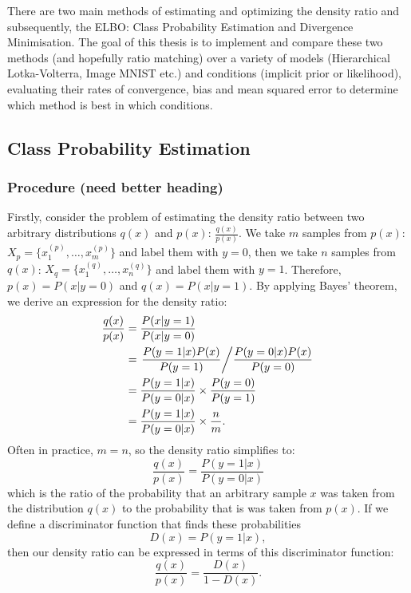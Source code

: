 \documentclass[a4paper,12pt]{article}
\numberwithin{equation}{section}
\begin{document}
There are two main methods of estimating and optimizing the density ratio and subsequently, the ELBO: Class Probability Estimation and Divergence Minimisation. The goal of this thesis is to implement and compare these two methods (and hopefully ratio matching) over a variety of models (Hierarchical Lotka-Volterra, Image MNIST etc.) and conditions (implicit prior or likelihood), evaluating their rates of convergence, bias and mean squared error to determine which method is best in which conditions.
\newpage
\subsection{Class Probability Estimation}
\subsubsection{Procedure (need better heading)}
Firstly, consider the problem of estimating the density ratio between two arbitrary distributions $q(x)$ and $p(x)$: $\frac{q(x)}{p(x)}$. We take $m$ samples from $p(x)$: $X_p=\{x_1^{(p)},\dots,x_m^{(p)}\}$
and label them with $y=0$, then we take $n$ samples from $q(x)$: $X_q=\{x_1^{(q)},\dots, x_n^{(q)}\}$ and label them with $y=1$. Therefore, $p(x)=P(x|y=0)$ and $q(x)=P(x|y=1)$. By applying Bayes' theorem, we derive an expression for the density ratio:
\begin{align*}
\frac{q(x)}{p(x)}&= \frac{P(x|y=1)}{P(x|y=0)}\\
&= \left.\frac{P(y=1|x)P(x)}{P(y=1)}\middle/ \frac{P(y=0|x)P(x)}{P(y=0)}\right.\\
&= \frac{P(y=1|x)}{P(y=0|x)}\times \frac{P(y=0)}{P(y=1)}\\
&= \frac{P(y=1|x)}{P(y=0|x)}\times \frac{n}{m}.
\end{align*}
Often in practice, $m=n$, so the density ratio simplifies to:
\[\frac{q(x)}{p(x)}=\frac{P(y=1|x)}{P(y=0|x)}\]
which is the ratio of the probability that an arbitrary sample $x$ was taken from the distribution $q(x)$ to the probability that is was taken from $p(x)$. If we define a discriminator function that finds these probabilities
\[D(x)=P(y=1|x),\]
then our density ratio can be expressed in terms of this discriminator function:
\[\frac{q(x)}{p(x)}=\frac{D(x)}{1-D(x)}.\]
\newpage
\end{document}
